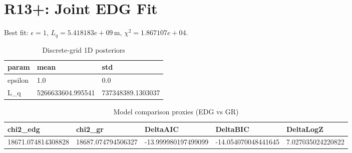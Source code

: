 \section{R13+: Joint EDG Fit}
Best fit: $\epsilon = 1$, $L_q = 5.418183e+09\,\mathrm{m}$, $\chi^2 = 1.867107e+04$.
\begin{table}[h!]
\centering
\caption{Discrete-grid 1D posteriors}
\label{tab:r13p_marg}
\begin{tabular}{l | l | l}
\hline
param & mean & std \\
\hline
epsilon & 1.0 & 0.0 \\
L_q & 5266633604.995541 & 737348389.1303037 \\
\hline
\end{tabular}
\end{table}

\begin{table}[h!]
\centering
\caption{Model comparison proxies (EDG vs GR)}
\label{tab:r13p_model}
\begin{tabular}{l | l | l | l | l}
\hline
chi2_edg & chi2_gr & DeltaAIC & DeltaBIC & DeltaLogZ \\
\hline
18671.074814308828 & 18687.074794506327 & -13.999980197499099 & -14.054070048441645 & 7.027035024220822 \\
\hline
\end{tabular}
\end{table}

